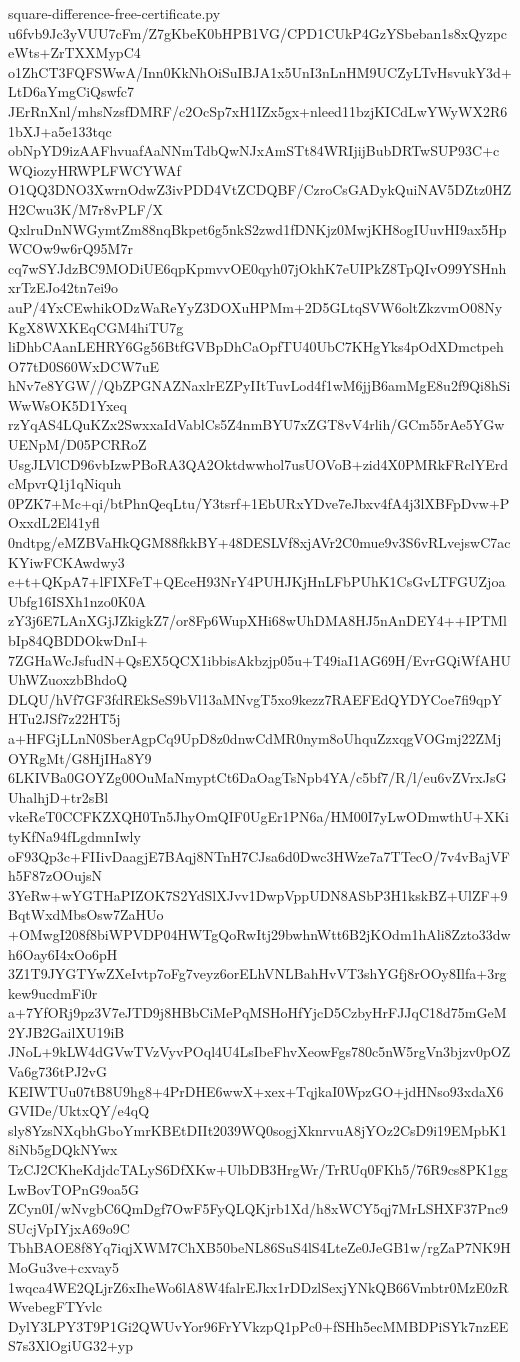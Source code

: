 \documentclass[11pt]{article}
\theoremstyle{definition}
\theoremstyle{remark}
\begin{document}
\begin{filecontents*}[overwrite]{square-difference-free-certificate.py}
u6fvb9Jc3yVUU7cFm/Z7gKbeK0bHPB1VG/CPD1CUkP4GzYSbeban1s8xQyzpceWts+ZrTXXMypC4
o1ZhCT3FQFSWwA/Inn0KkNhOiSuIBJA1x5UnI3nLnHM9UCZyLTvHsvukY3d+LtD6aYmgCiQswfc7
JErRnXnl/mhsNzsfDMRF/c2OcSp7xH1IZx5gx+nleed11bzjKICdLwYWyWX2R61bXJ+a5e133tqc
obNpYD9izAAFhvuafAaNNmTdbQwNJxAmSTt84WRIjijBubDRTwSUP93C+cWQiozyHRWPLFWCYWAf
O1QQ3DNO3XwrnOdwZ3ivPDD4VtZCDQBF/CzroCsGADykQuiNAV5DZtz0HZH2Cwu3K/M7r8vPLF/X
QxlruDnNWGymtZm88nqBkpet6g5nkS2zwd1fDNKjz0MwjKH8ogIUuvHI9ax5HpWCOw9w6rQ95M7r
cq7wSYJdzBC9MODiUE6qpKpmvvOE0qyh07jOkhK7eUIPkZ8TpQIvO99YSHnhxrTzEJo42tn7ei9o
auP/4YxCEwhikODzWaReYyZ3DOXuHPMm+2D5GLtqSVW6oltZkzvmO08NyKgX8WXKEqCGM4hiTU7g
liDhbCAanLEHRY6Gg56BtfGVBpDhCaOpfTU40UbC7KHgYks4pOdXDmctpehO77tD0S60WxDCW7uE
hNv7e8YGW//QbZPGNAZNaxlrEZPyIItTuvLod4f1wM6jjB6amMgE8u2f9Qi8hSiWwWsOK5D1Yxeq
rzYqAS4LQuKZx2SwxxaIdVablCs5Z4nmBYU7xZGT8vV4rlih/GCm55rAe5YGwUENpM/D05PCRRoZ
UsgJLVlCD96vbIzwPBoRA3QA2Oktdwwhol7usUOVoB+zid4X0PMRkFRclYErdcMpvrQ1j1qNiquh
0PZK7+Mc+qi/btPhnQeqLtu/Y3tsrf+1EbURxYDve7eJbxv4fA4j3lXBFpDvw+POxxdL2El41yfl
0ndtpg/eMZBVaHkQGM88fkkBY+48DESLVf8xjAVr2C0mue9v3S6vRLvejswC7acKYiwFCKAwdwy3
e+t+QKpA7+lFIXFeT+QEceH93NrY4PUHJKjHnLFbPUhK1CsGvLTFGUZjoaUbfg16ISXh1nzo0K0A
zY3j6E7LAnXGjJZkigkZ7/or8Fp6WupXHi68wUhDMA8HJ5nAnDEY4++IPTMlbIp84QBDDOkwDnI+
7ZGHaWcJsfudN+QsEX5QCX1ibbisAkbzjp05u+T49iaI1AG69H/EvrGQiWfAHUUhWZuoxzbBhdoQ
DLQU/hVf7GF3fdREkSeS9bVl13aMNvgT5xo9kezz7RAEFEdQYDYCoe7fi9qpYHTu2JSf7z22HT5j
a+HFGjLLnN0SberAgpCq9UpD8z0dnwCdMR0nym8oUhquZzxqgVOGmj22ZMjOYRgMt/G8HjIHa8Y9
6LKIVBa0GOYZg00OuMaNmyptCt6DaOagTsNpb4YA/c5bf7/R/l/eu6vZVrxJsGUhalhjD+tr2sBl
vkeReT0CCFKZXQH0Tn5JhyOmQIF0UgEr1PN6a/HM00I7yLwODmwthU+XKityKfNa94fLgdmnIwly
oF93Qp3c+FIIivDaagjE7BAqj8NTnH7CJsa6d0Dwc3HWze7a7TTecO/7v4vBajVFh5F87zOOujsN
3YeRw+wYGTHaPIZOK7S2YdSlXJvv1DwpVppUDN8ASbP3H1kskBZ+UlZF+9BqtWxdMbsOsw7ZaHUo
+OMwgI208f8biWPVDP04HWTgQoRwItj29bwhnWtt6B2jKOdm1hAli8Zzto33dwh6Oay6I4xOo6pH
3Z1T9JYGTYwZXeIvtp7oFg7veyz6orELhVNLBahHvVT3shYGfj8rOOy8Ilfa+3rgkew9ucdmFi0r
a+7YfORj9pz3V7eJTD9j8HBbCiMePqMSHoHfYjcD5CzbyHrFJJqC18d75mGeM2YJB2GailXU19iB
JNoL+9kLW4dGVwTVzVyvPOql4U4LsIbeFhvXeowFgs780c5nW5rgVn3bjzv0pOZVa6g736tPJ2vG
KEIWTUu07tB8U9hg8+4PrDHE6wwX+xex+TqjkaI0WpzGO+jdHNso93xdaX6GVIDe/UktxQY/e4qQ
sly8YzsNXqbhGboYmrKBEtDIIt2039WQ0sogjXknrvuA8jYOz2CsD9i19EMpbK18iNb5gDQkNYwx
TzCJ2CKheKdjdcTALyS6DfXKw+UlbDB3HrgWr/TrRUq0FKh5/76R9cs8PK1ggLwBovTOPnG9oa5G
ZCyn0I/wNvgbC6QmDgf7OwF5FyQLQKjrb1Xd/h8xWCY5qj7MrLSHXF37Pnc9SUcjVpIYjxA69o9C
TbhBAOE8f8Yq7iqjXWM7ChXB50beNL86SuS4lS4LteZe0JeGB1w/rgZaP7NK9HMoGu3ve+cxvay5
1wqca4WE2QLjrZ6xIheWo6lA8W4falrEJkx1rDDzlSexjYNkQB66Vmbtr0MzE0zRWvebegFTYvlc
DylY3LPY3T9P1Gi2QWUvYor96FrYVkzpQ1pPc0+fSHh5ecMMBDPiSYk7nzEES7s3XlOgiUG32+yp

\end{filecontents*}
\end{document}
